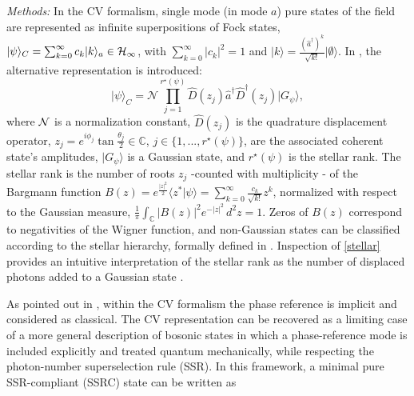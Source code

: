 \documentclass[aps,prl,showpacs,twocolumn]{revtex4-2}
\providecommand{\bra}[1]{\langle #1 \rvert}
\providecommand{\ket}[1]{\lvert #1 \rangle}
\providecommand{\be}{\begin{equation}}
\providecommand{\ee}{\end{equation}}
\providecommand{\bra}[1]{\langle #1 \rvert}
\providecommand{\ket}[1]{\lvert #1 \rangle}
\providecommand{\be}{\begin{equation}}
\providecommand{\ee}{\end{equation}}
\providecommand{\bra}[1]{\langle #1 \rvert}
\providecommand{\ket}[1]{\lvert #1 \rangle}
\providecommand{\be}{\begin{equation}}
\providecommand{\ee}{\end{equation}}
\providecommand{\bra}[1]{\langle #1 \rvert}
\providecommand{\ket}[1]{\lvert #1 \rangle}
\providecommand{\be}{\begin{equation}}
\providecommand{\ee}{\end{equation}}
\begin{document}
{\it Methods:} In the CV formalism, single mode (in mode $a$) pure states of the field are represented as infinite superpositions of Fock states, $\ket{\psi}_{C}= \sum_{k=0}^{\infty} c_k \ket{k}_a \in {\cal H}_{\infty}$, with $\sum_{k=0}^{\infty}|c_k|^2=1$ and $\ket{k}=\frac{(\hat a^{\dagger})^k}{\sqrt{k!}}\ket{\emptyset}$. In \cite{Stellar}, the alternative representation is introduced:
\be\label{stellar}
 \ket{\psi}_{C} = {\mathcal{N}}\prod_{j=1}^{r^\star(\psi)}\hat D(z_j)\hat{a}^\dagger \hat D^\dagger(z_j) \ket{G_\psi},
 \ee
where ${\cal N}$ is a normalization constant, $\hat D(z_j)$ is the quadrature displacement operator, $z_j = e^{i\phi_j}\tan{\frac{{\theta_j}}{2}} \in \mathbb{C}$, $j \in \{1,...,r^\star(\psi)\}$, are the associated coherent state's amplitudes, $\ket{G_\psi}$ is a Gaussian state, and $r^\star(\psi)$ is the stellar rank. The stellar rank is the number of roots $z_j$  -counted with multiplicity - of the Bargmann function \cite{Bargmann1961} $B(z)=e^{\frac{|z|^2}{2}}\bra{z^*}\psi\rangle = \sum_{k=0}^\infty \frac{c_k}{\sqrt{k!}}z^k$, normalized with respect to the Gaussian measure, $\frac{1}{\pi}\int_{\mathbb{C}} |B(z)|^2 e^{-|z|^2} \, d^2 z = 1$.
Zeros of $B(z)$ correspond to negativities of the Wigner function, and non-Gaussian states can be classified according to the stellar hierarchy, formally defined in \cite{Stellar}.
Inspection of \eqref{stellar} provides an intuitive interpretation of  the stellar rank as the number of displaced photons added to a Gaussian state \cite{PhysRevLett.123.043601, Fiurasek:22}.

As pointed out in  \cite{PhysRevA.68.042329, PhysRevA.55.3195, PhysRevA.58.4244,PhysRevA.58.4247,doi:10.1142/S0219749906001591,Sanders_2012,PhysRev.155.1428,RevModPhys.79.555}, within the CV formalism the phase reference is implicit and considered as classical. The CV representation can be recovered as a limiting case of a more general description of bosonic states in which a phase-reference mode is included explicitly and treated quantum mechanically, while respecting the photon-number superselection rule (SSR). In this framework, a minimal pure SSR-compliant (SSRC) state can be written as
\end{document}

